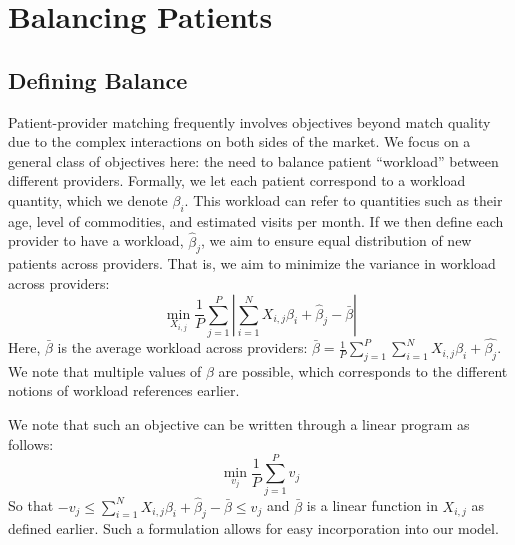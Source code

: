 \section{Balancing Patients}
\subsection{Defining Balance}
Patient-provider matching frequently involves objectives beyond match quality due to the complex interactions on both sides of the market. 
We focus on a general class of objectives here: the need to balance patient ``workload'' between different providers. 
Formally, we let each patient correspond to a workload quantity, which we denote $\beta_{i}$. 
This workload can refer to quantities such as their age, level of commodities, and estimated visits per month. 
If we then define each provider to have a workload, $\hat{\beta}_{j}$, we aim to ensure equal distribution of new patients across providers. 
That is, we aim to minimize the variance in workload across providers: 
\begin{equation}
    \min\limits_{X_{i,j}} \frac{1}{P} \sum_{j=1}^{P} |\sum_{i=1}^{N} X_{i,j} \beta_{i} + \hat{\beta}_{j} - \bar{\beta}| 
\end{equation}
Here, $\bar{\beta}$ is the average workload across providers: $\bar{\beta} = \frac{1}{P} \sum_{j=1}^P \sum_{i=1}^{N} X_{i,j} \beta_{i} + \hat{\beta_{j}}$. 
We note that multiple values of $\beta$ are possible, which corresponds to the different notions of workload references earlier. 

We note that such an objective can be written through a linear program as follows: 
\begin{equation}
    \min\limits_{v_{j}} \frac{1}{P} \sum_{j=1}^{P} v_{j}
\end{equation}
So that $-v_{j} \leq \sum_{i=1}^{N} X_{i,j} \beta_{i} + \hat{\beta}_{j} - \bar{\beta}\leq v_{j}$ and $\bar{\beta}$ is a linear function in $X_{i,j}$ as defined earlier. 
Such a formulation allows for easy incorporation into our model.

